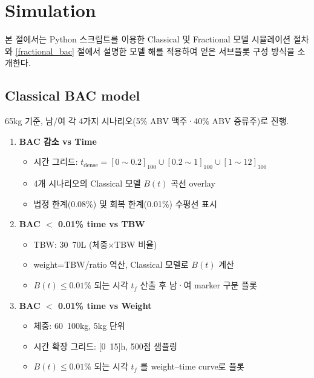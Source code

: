 \documentclass[11pt]{article}
\begin{document}

\section{Simulation}

본 절에서는 Python 스크립트를 이용한 Classical 및 Fractional 모델 시뮬레이션 절차와 \ref{fractional_bac} 절에서 설명한 모델 해를 적용하여 얻은 서브플롯 구성 방식을 소개한다.

\subsection{Classical BAC model}
65kg 기준, 남/여 각 4가지 시나리오(5\% ABV 맥주·40\% ABV 증류주)로 진행. 
\begin{enumerate}
  \item \textbf{BAC 감소 vs Time}\
    \begin{itemize}
      \item 시간 그리드: $t_{\mathrm{dense}}=[0\sim0.2]_{100}\cup[0.2\sim1]_{100}\cup[1\sim12]_{300}$
      \item 4개 시나리오의 Classical 모델 $B(t)$ 곡선 overlay
      \item 법정 한계(0.08\%) 및 회복 한계(0.01\%) 수평선 표시
    \end{itemize}

  \item \textbf{BAC $<$ 0.01\% time vs TBW}\
    \begin{itemize}
      \item TBW: 30~70L (체중$\times$TBW 비율)
      \item weight=TBW/ratio 역산, Classical 모델로 $B(t)$ 계산
      \item $B(t)\le0.01\%$ 되는 시각 $t_f$ 산출 후 남·여 marker 구분 플롯
    \end{itemize}

  \item \textbf{BAC $<$ 0.01\% time vs Weight}\
    \begin{itemize}
      \item 체중: 60~100kg, 5kg 단위
      \item 시간 확장 그리드: [0~15]h, 500점 샘플링
      \item $B(t)\le0.01\%$ 되는 시각 $t_f$ 를 weight–time curve로 플롯
    \end{itemize}
\end{enumerate}
\end{document}
